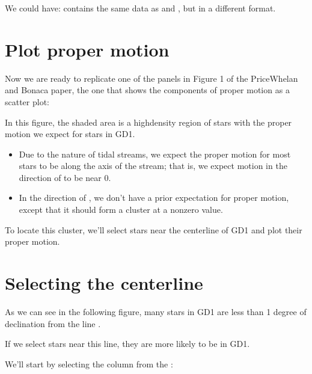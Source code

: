 \documentclass[letterpaper,10pt,english]{sphinxmanual}
\begin{document}
We could have:  contains the same data as  and , but in a different format.


\section{Plot proper motion}
\label{\detokenize{03_motion:plot-proper-motion}}
Now we are ready to replicate one of the panels in Figure 1 of the Price\sphinxhyphen{}Whelan and Bonaca paper, the one that shows the components of proper motion as a scatter plot:



In this figure, the shaded area is a high\sphinxhyphen{}density region of stars with the proper motion we expect for stars in GD\sphinxhyphen{}1.
\begin{itemize}
\item {} 
Due to the nature of tidal streams, we expect the proper motion for most stars to be along the axis of the stream; that is, we expect motion in the direction of  to be near 0.

\item {} 
In the direction of , we don’t have a prior expectation for proper motion, except that it should form a cluster at a non\sphinxhyphen{}zero value.

\end{itemize}

To locate this cluster, we’ll select stars near the centerline of GD\sphinxhyphen{}1 and plot their proper motion.


\section{Selecting the centerline}
\label{\detokenize{03_motion:selecting-the-centerline}}
As we can see in the following figure, many stars in GD\sphinxhyphen{}1 are less than 1 degree of declination from the line .



If we select stars near this line, they are more likely to be in GD\sphinxhyphen{}1.

We’ll start by selecting the  column from the :

\begin{sphinxVerbatim}[commandchars=\\\{\}]
  \PYG{p}{[}\PYG{p}{]}
\end{sphinxVerbatim}
\end{document}
